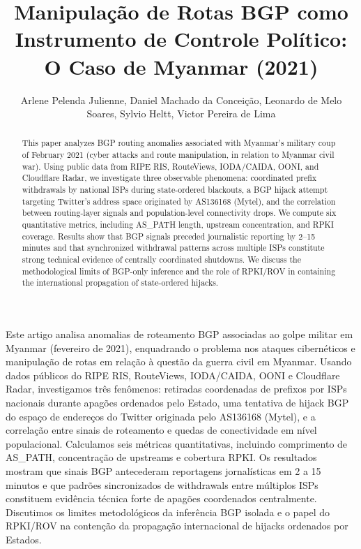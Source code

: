 \documentclass[12pt]{article}
\title{Manipulação de Rotas BGP como Instrumento de Controle Político:\\
O Caso de Myanmar (2021)}
\author{Arlene Pelenda Julienne\inst{1}, Daniel Machado da Conceição\inst{1}, Leonardo de Melo Soares\inst{1}, Sylvio Heltt\inst{1}, Victor Pereira de Lima\inst{1}}
\begin{document}
\maketitle

\begin{abstract}
  This paper analyzes BGP routing anomalies associated with Myanmar's military
  coup of February 2021 (cyber attacks and route manipulation,
  in relation to Myanmar civil war). Using public data
  from RIPE RIS, RouteViews, IODA/CAIDA, OONI, and Cloudflare Radar, we
  investigate three observable phenomena: coordinated prefix withdrawals by
  national ISPs during state-ordered blackouts, a BGP hijack attempt targeting
  Twitter's address space originated by AS136168 (Mytel), and the correlation
  between routing-layer signals and population-level connectivity drops. We
  compute six quantitative metrics, including AS\_PATH length, upstream
  concentration, and RPKI coverage. Results show that BGP signals preceded
  journalistic reporting by 2--15 minutes and that synchronized withdrawal
  patterns across multiple ISPs constitute strong technical evidence of
  centrally coordinated shutdowns. We discuss the methodological limits of
  BGP-only inference and the role of RPKI/ROV in containing the international
  propagation of state-ordered hijacks.
\end{abstract}

\begin{resumo}
  Este artigo analisa anomalias de roteamento BGP associadas ao golpe militar
  em Myanmar (fevereiro de 2021), enquadrando o problema nos ataques cibernéticos e manipulação de rotas
  em relação à questão da guerra civil em Myanmar. Usando dados públicos do RIPE RIS,
  RouteViews, IODA/CAIDA, OONI e Cloudflare Radar, investigamos três fenômenos:
  retiradas coordenadas de prefixos por ISPs nacionais durante apagões
  ordenados pelo Estado, uma tentativa de hijack BGP do espaço de endereços do
  Twitter originada pelo AS136168 (Mytel), e a correlação entre sinais de
  roteamento e quedas de conectividade em nível populacional. Calculamos seis
  métricas quantitativas, incluindo comprimento de AS\_PATH, concentração de
  upstreams e cobertura RPKI. Os resultados mostram que sinais BGP antecederam
  reportagens jornalísticas em 2 a 15 minutos e que padrões sincronizados de
  withdrawals entre múltiplos ISPs constituem evidência técnica forte de apagões
  coordenados centralmente. Discutimos os limites metodológicos da inferência
  BGP isolada e o papel do RPKI/ROV na contenção da propagação internacional de
  hijacks ordenados por Estados.
\end{resumo}
\end{document}
